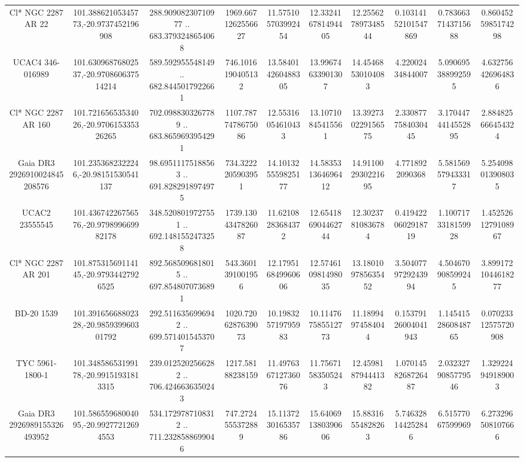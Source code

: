 \begin{table}
\begin{tabular}{cccccccccc}
Cl* NGC 2287     AR      22 & 101.38862105345773,-20.9737452196908 & 288.90908230710977 .. 683.3793248654068 & 1969.6671262556627 & 11.575105703992454 & 12.332416781494405 & 12.255627897348544 & 0.10314152101547869 & 0.7836637143715688 & 0.8604525985174298 \\
UCAC4 346-016989 & 101.63096876802537,-20.970860637514214 & 589.592955548149 .. 682.8445017922661 & 746.1016190405132 & 13.584014260488305 & 13.99674633901307 & 14.45468530104083 & 4.22002434844007 & 5.090695388992595 & 4.632756426964836 \\
Cl* NGC 2287     AR     160 & 101.72165653534026,-20.970615335326265 & 702.0988303267789 .. 683.8659693954291 & 1107.7877478675086 & 12.55316054610433 & 13.10710845415561 & 13.392730229156575 & 2.3308777584030445 & 3.1704474414552895 & 2.884825666454324 \\
Gaia DR3 2926910024845208576 & 101.2353682322246,-20.98151530541137 & 98.69511175188563 .. 691.8282918974975 & 734.3222205903951 & 14.101325559825177 & 14.583531364696412 & 14.911002930221695 & 4.7718922090368 & 5.581569579433317 & 5.254098013908035 \\
UCAC2  23555545 & 101.43674226756576,-20.979899669982178 & 348.5208019727551 .. 692.1481552473258 & 1739.1304347826087 & 11.62108283684372 & 12.654186904462744 & 12.30237810836784 & 0.4194220602918719 & 1.1007173318159928 & 1.4525261279108967 \\
Cl* NGC 2287     AR     201 & 101.87531569114145,-20.97934427926525 & 892.5685096818015 .. 697.8548070736891 & 543.3601391001956 & 12.179516849960606 & 12.574610981498035 & 13.180109785635452 & 3.5040779729243994 & 4.504670908599245 & 3.8991721044618277 \\
BD-20  1539 & 101.39165668802328,-20.985939960301792 & 292.5116356996942 .. 699.5714015453707 & 1020.7206287639073 & 10.198325719795983 & 10.114767585512773 & 11.18994974584044 & 0.15379126004041943 & 1.1454152860848765 & 0.07023312575720908 \\
TYC 5961-1800-1 & 101.34858653199178,-20.99151931813315 & 239.0125202566282 .. 706.4246636350243 & 1217.58188238159 & 11.497636712736076 & 11.75671583505243 & 12.459818794441382 & 1.0701458268726487 & 2.0323279085779546 & 1.329224949189003 \\
Gaia DR3 2926989155326493952 & 101.58655968004095,-20.99277212694553 & 534.1729787108312 .. 711.2328588699046 & 747.2724555372889 & 15.113723016535786 & 15.640691380390606 & 15.88316554828263 & 5.746328144252846 & 6.51577067599969 & 6.273296508107666 \\

\end{tabular}
\end{table}
